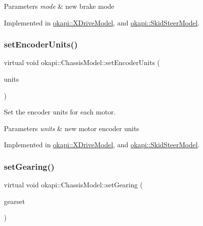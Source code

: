 \begin{DoxyParams}{Parameters}
{\em mode} & new brake mode \\
\hline
\end{DoxyParams}


Implemented in \mbox{\hyperlink{classokapi_1_1XDriveModel_a27356e54c9fd0361d01de4c81ff851e7}{okapi\+::\+X\+Drive\+Model}}, and \mbox{\hyperlink{classokapi_1_1SkidSteerModel_a84c100815058f4dcdc958b3349713f73}{okapi\+::\+Skid\+Steer\+Model}}.

\mbox{\label{classokapi_1_1ChassisModel_ae8ba9a72bf827af4c6feffaac99b33ee}} 
\subsubsection{\texorpdfstring{setEncoderUnits()}{setEncoderUnits()}}
{\footnotesize\ttfamily virtual void okapi\+::\+Chassis\+Model\+::set\+Encoder\+Units (\begin{DoxyParamCaption}\item[{\mbox{\hyperlink{classokapi_1_1AbstractMotor_ae811cd825099f2defadeb1b7f7e7764c}{Abstract\+Motor\+::encoder\+Units}}}]{units }\end{DoxyParamCaption})\hspace{0.3cm}{\ttfamily [pure virtual]}}

Set the encoder units for each motor.


\begin{DoxyParams}{Parameters}
{\em units} & new motor encoder units \\
\hline
\end{DoxyParams}


Implemented in \mbox{\hyperlink{classokapi_1_1XDriveModel_a56b590280c856259ad710e888d8e215c}{okapi\+::\+X\+Drive\+Model}}, and \mbox{\hyperlink{classokapi_1_1SkidSteerModel_a8922c028a9f09893061938fe50fb2a79}{okapi\+::\+Skid\+Steer\+Model}}.

\mbox{\label{classokapi_1_1ChassisModel_a960d6ce2f21e5832fce1d7566408cb61}} 
\subsubsection{\texorpdfstring{setGearing()}{setGearing()}}
{\footnotesize\ttfamily virtual void okapi\+::\+Chassis\+Model\+::set\+Gearing (\begin{DoxyParamCaption}\item[{\mbox{\hyperlink{classokapi_1_1AbstractMotor_a88aaa6ea2fa10f5520a537bbf26774d5}{Abstract\+Motor\+::gearset}}}]{gearset }\end{DoxyParamCaption})\hspace{0.3cm}{\ttfamily [pure virtual]}}

